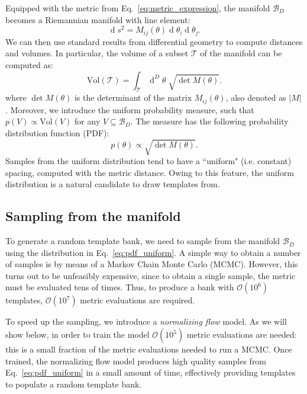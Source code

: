 \documentclass[twocolumn,showpacs,preprintnumbers,nofootinbib,prd,
superscriptaddress,10pt]{revtex4-2}
\renewcommand{\d}[1]{\ensuremath{\operatorname{d}\!{#1}}}
\newcommand{\dvol}[2]{\ensuremath{\operatorname{d}^{#2}\!{#1}}}
\begin{document}
Equipped with the metric from Eq.~\eqref{eq:metric_expression}, the manifold $\mathcal{B}_D$ becomes a Riemannian manifold with line element:
\begin{equation}\label{eq:line_element}
	\d{s^2} = M_{ij}(\theta) \d{\theta_i} \d{\theta_j}.
\end{equation}
We can then use standard results from differential geometry to compute distances and volumes. In particular, the volume of a subset $\mathcal{T}$ of the manifold can be computed as:
\begin{equation}\label{eq:volume_tile}
	\text{Vol}(\mathcal{T}) = \int_\mathcal{T} \dvol{\theta}{D} \; \sqrt{\det M(\theta)}.
\end{equation}
where $\det M(\theta)$ is the determinant of the matrix $M_{ij}(\theta)$, also denoted as $|M|$.
%
Moreover, we introduce the uniform probability measure, such that $p(V) \propto \text{Vol}(V)$ for any $V\subseteq \mathcal{B}_D$. The measure has the following probability distribution function (PDF):
\begin{equation}\label{eq:pdf_uniform}
	p(\theta) \propto \sqrt{\det M(\theta)}.
\end{equation}
Samples from the uniform distribution tend to have a ``uniform" (i.e. constant) spacing, computed with the metric distance. Owing to this feature, the uniform distribution is a natural candidate to draw templates from.

\subsection{Sampling from the manifold} \label{sec:normalizing_flow}

To generate a random template bank, we need to sample from the manifold $\mathcal{B}_D$ using the distribution in Eq.~\eqref{eq:pdf_uniform}.
A simple way to obtain a number of samples is by means of a Markov Chain Monte Carlo (MCMC). However, this turns out to be unfeasibly expensive, since to obtain a single sample, the metric must be evaluated tens of times.
Thus, to produce a bank with $\mathcal{O}(10^6)$ templates, $\mathcal{O}(10^7)$ metric evaluations are required.

To speed up the sampling, we introduce a {\it normalizing flow} model. As we will show below, in order to train the model $\mathcal{O}(10^5)$ metric evaluations are needed: this is a small fraction of the metric evaluations needed to run a MCMC.
Once trained, the normalizing flow model produces high quality samples from Eq.~\eqref{eq:pdf_uniform} in a small amount of time, effectively providing templates to populate a random template bank.
\end{document}
